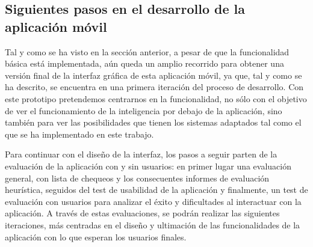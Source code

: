 \subsection{Siguientes pasos en el desarrollo de la aplicación móvil}

Tal y como se ha visto en la sección anterior, a pesar de que la funcionalidad básica está implementada, aún queda un amplio recorrido para obtener una versión final de la interfaz gráfica de esta aplicación móvil, ya que, tal y como se ha descrito, se encuentra en una primera iteración del proceso de desarrollo. Con este prototipo pretendemos centrarnos en la funcionalidad, no sólo con el objetivo de ver el funcionamiento de la inteligencia por debajo de la aplicación, sino también para ver las posibilidades que tienen los sistemas adaptados tal como el que se ha implementado en este trabajo. 

Para continuar con el diseño de la interfaz, los pasos a seguir parten de la evaluación de la aplicación con y sin usuarios: en primer lugar una evaluación general, con lista de chequeos y los consecuentes informes de evaluación heurística, seguidos del test de usabilidad de la aplicación y finalmente, un test de evaluación con usuarios para analizar el éxito y dificultades al interactuar con la aplicación. A través de estas evaluaciones, se podrán realizar las siguientes iteraciones, más centradas en el diseño y ultimación de las funcionalidades de la aplicación con lo que esperan los usuarios finales.

